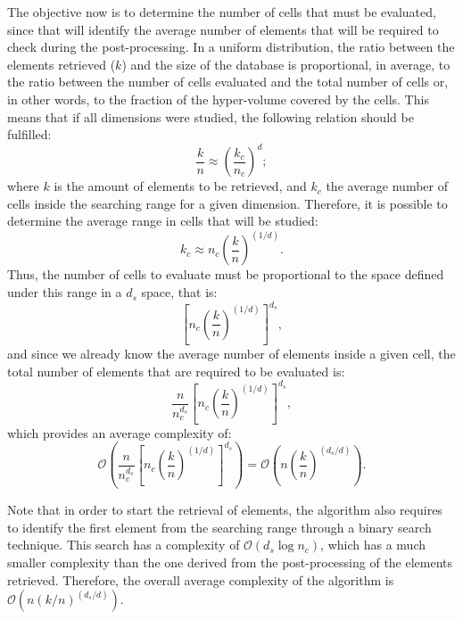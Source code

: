 \documentclass[review]{elsarticle}
\begin{document}
The objective now is to determine the number of cells that must be evaluated, since that will identify the average number of elements that will be required to check during the post-processing. In a uniform distribution, the ratio between the elements retrieved ($k$) and the size of the database is proportional, in average, to the ratio between the number of cells evaluated and the total number of cells or, in other words, to the fraction of the hyper-volume covered by the cells. This means that if all dimensions were studied, the following relation should be fulfilled:
\begin{equation}
\displaystyle\frac{k}{n}\approx\left(\frac{k_c}{n_c}\right)^d;
\end{equation}
where $k$ is the amount of elements to be retrieved, and $k_c$ the average number of cells inside the searching range for a given dimension. Therefore, it is possible to determine the average range in cells that will be studied:
\begin{equation}
k_c\approx n_c\left(\displaystyle\frac{k}{n}\right)^{(1/d)}.
\end{equation}
Thus, the number of cells to evaluate must be proportional to the space defined under this range in a $d_s$ space, that is:
\begin{equation}
\left[n_c\left(\displaystyle\frac{k}{n}\right)^{(1/d)}\right]^{d_s},
\end{equation}
and since we already know the average number of elements inside a given cell, the total number of elements that are required to be evaluated is:
\begin{equation}
\displaystyle\frac{n}{n_c^{d_s}}\left[n_c\left(\displaystyle\frac{k}{n}\right)^{(1/d)}\right]^{d_s},
\end{equation}
which provides an average complexity of:
\begin{equation}\label{eq:complexity}
\mathcal{O}\left(\displaystyle\frac{n}{n_c^{d_s}}\left[n_c\left(\displaystyle\frac{k}{n}\right)^{(1/d)}\right]^{d_s}\right) = \mathcal{O}\left(n\left(\displaystyle\frac{k}{n}\right)^{(d_s/d)}\right).
\end{equation}

Note that in order to start the retrieval of elements, the algorithm also requires to identify the first element from the searching range through a binary search technique. This search has a complexity of $\mathcal{O}\left(d_s\log{n_c}\right)$, which has a much smaller complexity than the one derived from the post-processing of the elements retrieved. Therefore, the overall average complexity of the algorithm is $\mathcal{O}(n\left(k/n\right)^{(d_s/d)})$.
\end{document}

